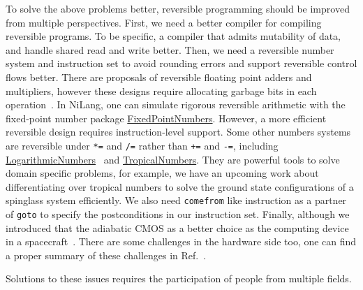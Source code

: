 \documentclass{article}
\newcommand{\<}{\langle}
\renewcommand{\>}{\rangle}
\newcommand{\Ref}[1]{Ref.~\cite{#1}}
\theoremstyle{definition}\newtheorem{definition}{\textit{Definition}}
\begin{document}
To solve the above problems better, reversible programming should be improved from multiple perspectives.
First, we need a better compiler for compiling reversible programs.
To be specific, a compiler that admits mutability of data, and handle shared read and write better.
Then, we need a reversible number system and instruction set to avoid rounding errors and support reversible control flows better.
There are proposals of reversible floating point adders and multipliers, however these designs require allocating garbage bits in each operation~\cite{Nachtigal2010,Nachtigal2011,Nguyen2013,Hner2018}.
In NiLang, one can simulate rigorous reversible arithmetic with the fixed-point number package \href{https://github.com/JuliaMath/FixedPointNumbers.jl}{FixedPointNumbers}.
However, a more efficient reversible design requires instruction-level support.
Some other numbers systems are reversible under \texttt{*=} and \texttt{/=} rather than \texttt{+=} and \texttt{-=}, including \href{https://github.com/cjdoris/LogarithmicNumbers.jl}{LogarithmicNumbers}~\cite{Taylor1988} and \href{https://github.com/GiggleLiu/TropicalNumbers.jl}{TropicalNumbers}.
They are powerful tools to solve domain specific problems, for example, we have an upcoming work about differentiating over tropical numbers to solve the ground state configurations of a spinglass system efficiently.
We also need \texttt{comefrom} like instruction as a partner of \texttt{goto} to specify the postconditions in our instruction set.
Finally, although we introduced that the adiabatic CMOS as a better choice as the computing device in a spacecraft~\cite{Debenedictis2017}.
There are some challenges in the hardware side too, one can find a proper summary of these challenges in \Ref{Frank2005b}.

Solutions to these issues requires the participation of people from multiple fields.



\end{document}
